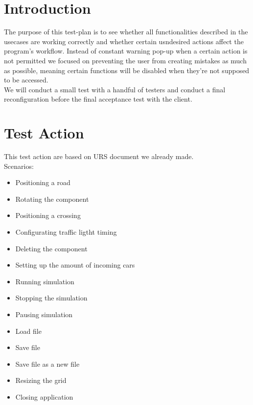 \documentclass[a4paper,11pt]{article}
\title{\Title}
\author{}
\date{\today}
\begin{document}
\begin{titlepage}
\maketitle
\end{titlepage}
	\linespread{1.15}
	\tableofcontents
	\newpage
	\section{Introduction}
	The purpose of this test-plan is to see whether all functionalities described in the usecases are working correctly and whether certain usndesired actions affect the program's workflow. Instead of constant warning pop-up when a certain action is not permitted we focused on preventing the user from creating mistakes as much as possible, meaning certain functions will be disabled when they're not supposed to be accessed.\\
	We will conduct a small test with a handful of testers and conduct a final reconfiguration before the final acceptance test with the client.
	
	\section{Test Action}
	This test action are based on URS document we already made.\\
	
	Scenarios: 
	\begin{itemize}
		\item Positioning a road
		\item Rotating the component
		\item Positioning a crossing
		\item Configurating traffic ligtht timing
		\item Deleting the component
		\item Setting up the amount of incoming cars 
		\item Running simulation
		\item Stopping the simulation
		\item Pausing simulation
		\item Load file
		\item Save file
		\item Save file as a new file
		\item Resizing the grid
		\item Closing application
	\end{itemize}
	
	\newpage
	
\end{document}
